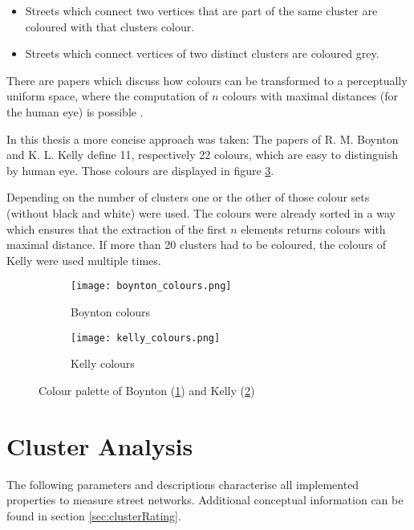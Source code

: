 \begin{itemize}
    \item Streets which connect two vertices that are part of the same cluster are coloured with that clusters colour.
    \item Streets which connect vertices of two distinct clusters are coloured grey.
\end{itemize}

There are papers which discuss how colours can be transformed to a perceptually uniform space, where the computation of $n$ colours with maximal distances (for the human eye) is possible \cite{colors:2006}.

In this thesis a more concise approach was taken: The papers of R. M. Boynton \cite{boynton:1989} and K. L. Kelly \cite{kelly:1965} define 11, respectively 22 colours, which are easy to distinguish by human eye. Those colours are displayed in figure \ref{fig:colours}.

Depending on the number of clusters one or the other of those colour sets (without black and white) were used. The colours were already sorted in a way which ensures that the extraction of the first $n$ elements returns colours with maximal distance. If more than 20 clusters had to be coloured, the colours of Kelly were used multiple times.

\begin{figure}
    \centering
    \begin{subfigure}[b]{\textwidth}
        \begin{mdframed}[style=mdthight]
            \texttt{[image: boynton\_colours.png]}
        \end{mdframed}
        \caption{Boynton colours}
        \label{fig:boynton_colours}
    \end{subfigure}
    \par\medskip
    \begin{subfigure}[b]{\textwidth}
        \begin{mdframed}[style=mdthight]
            \texttt{[image: kelly\_colours.png]}
        \end{mdframed}
        \caption{Kelly colours}
        \label{fig:kelly_colurs}
    \end{subfigure}
    \caption{Colour palette of Boynton (\ref{fig:boynton_colours}) and Kelly (\ref{fig:kelly_colurs})}
    \label{fig:colours}
\end{figure}

\FloatBarrier
\pagebreak
\section{Cluster Analysis}
\label{sec:cluster_analysis_impl}
The following parameters and descriptions characterise all implemented properties to measure street networks. Additional conceptual information can be found in section \ref{sec:clusterRating}.

